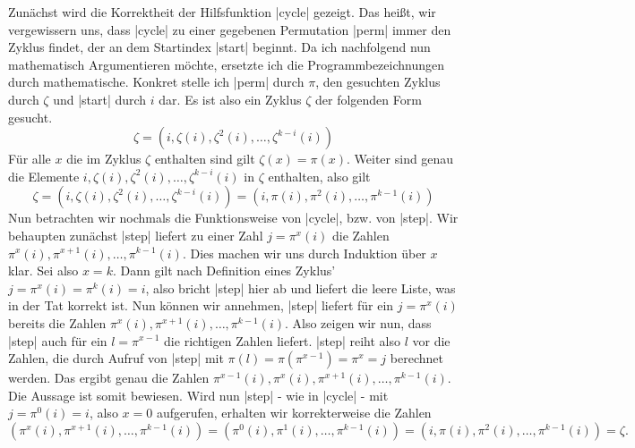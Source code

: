 Zunächst wird die Korrektheit der Hilfsfunktion |cycle| gezeigt.
Das heißt, wir vergewissern uns, dass |cycle| zu einer gegebenen Permutation |perm| immer den Zyklus findet, der an dem Startindex |start| beginnt.
Da ich nachfolgend nun mathematisch Argumentieren möchte, ersetzte ich die Programmbezeichnungen durch mathematische.
Konkret stelle ich |perm| durch $\pi$, den gesuchten Zyklus durch $\zeta$ und |start| durch $i$ dar.
Es ist also ein Zyklus $\zeta$ der folgenden Form gesucht.
\[ \zeta = (i, \zeta(i),\zeta^2(i), \dots, \zeta^{k-i}(i)) \]
Für alle $x$ die im Zyklus $\zeta$ enthalten sind gilt $\zeta(x) = \pi(x)$.
Weiter sind genau die Elemente \linebreak $i, \zeta(i),\zeta^2(i), \dots, \zeta^{k-i}(i)$ in $\zeta$ enthalten, also gilt
\[ \zeta = (i, \zeta(i),\zeta^2(i), \dots, \zeta^{k-i}(i)) = (i, \pi(i),\pi^2(i), \dots, \pi^{k-1}(i)) \]
Nun betrachten wir nochmals die Funktionsweise von |cycle|, bzw. von |step|.
Wir behaupten zunächst |step| liefert zu einer Zahl $j = \pi^x(i)$ die Zahlen $\pi^x(i), \pi^{x+1}(i), \dots, \pi^{k-1}(i)$.
Dies machen wir uns durch Induktion über $x$ klar. Sei also $x = k$.
Dann gilt nach Definition eines Zyklus' $j = \pi^x(i) = \pi^k(i) = i$, also bricht |step| hier ab und liefert die leere Liste, was in der Tat korrekt ist.
Nun können wir annehmen, |step| liefert für ein $j = \pi^x(i)$ bereits die Zahlen $\pi^x(i), \pi^{x+1}(i), \dots, \pi^{k-1}(i)$.
Also zeigen wir nun, dass |step| auch für ein $l = \pi^{x-1}$ die richtigen Zahlen liefert.
|step| reiht also $l$ vor die Zahlen, die durch Aufruf von |step| mit $\pi(l) = \pi(\pi^{x-1}) = \pi^x = j$ berechnet werden.
Das ergibt genau die Zahlen $\pi^{x-1}(i), \pi^x(i), \pi^{x+1}(i), \dots, \pi^{k-1}(i)$.
Die Aussage ist somit bewiesen.
Wird nun |step| - wie in |cycle| - mit $j = \pi^0(i) = i$, also $x = 0$ aufgerufen, erhalten wir korrekterweise die Zahlen
\[ (\pi^x(i), \pi^{x+1}(i), \dots, \pi^{k-1}(i)) = (\pi^0(i), \pi^1(i), \dots, \pi^{k-1}(i)) = (i, \pi(i), \pi^2(i), \dots, \pi^{k-1}(i)) = \zeta.\]

